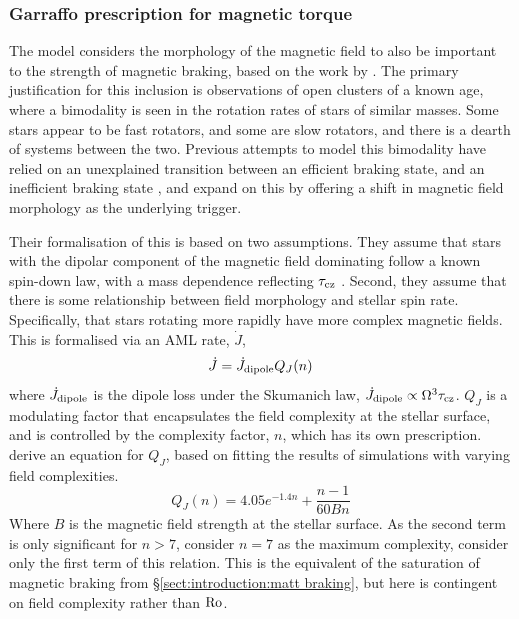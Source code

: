 \subsubsection{Garraffo prescription for magnetic torque}
\label{sect:introduction:Garraffo magnetic braking prescription}

The \citet{garraffo2018a} model considers the morphology of the magnetic field to also be important to the strength of magnetic braking, based on the work by \citet{garraffo2015}. The primary justification for this inclusion is observations of open clusters of a known age, where a bimodality is seen in the rotation rates of stars of similar masses. Some stars appear to be fast rotators, and some are slow rotators, and there is a dearth of systems between the two. 
Previous attempts to model this bimodality have relied on an unexplained transition between an efficient braking state, and an inefficient braking state \citep{spada2011,reiners2012, gallet2013}, and \citet{garraffo2018a} expand on this by offering a shift in magnetic field morphology as the underlying trigger.

Their formalisation of this is based on two assumptions. They assume that stars with the dipolar component of the magnetic field dominating  follow a known spin-down law, with a mass dependence reflecting $\tau_{\rm cz}$ \citep{skumanich1972}. Second, they assume that there is some relationship between field morphology and stellar spin rate. Specifically, that stars rotating more rapidly have more complex magnetic fields. This is formalised via an AML rate, $\dot J$,
\begin{equation}
    \dot J = \dot J_{\rm dipole}Q_J(n)
\end{equation}
where $\dot J_{\rm dipole}$ is the dipole loss under the Skumanich law, $\dot J_{\rm dipole} \propto \Omega^3 \tau_{\rm cz}$. $Q_J$ is a modulating factor that encapsulates the field complexity at the stellar surface, and is controlled by the complexity factor, $n$, which has its own prescription. \citet{garraffo2016} derive an equation for $Q_J$, based on fitting the results of simulations with varying field complexities.
\begin{equation}
    \label{eqn:introduction:garraffo complexity modulation}
    Q_J(n) = 4.05 e^{-1.4n} + \frac{n-1}{60Bn}
\end{equation}
Where $B$ is the magnetic field strength at the stellar surface. As the second term is only significant for $n > 7$, \citet{garraffo2018a} consider $n = 7$ as the maximum complexity, consider only the first term of this relation. This is the equivalent of the saturation of magnetic braking from \S\ref{sect:introduction:matt braking}, but here is contingent on field complexity rather than $\rm Ro$. 

